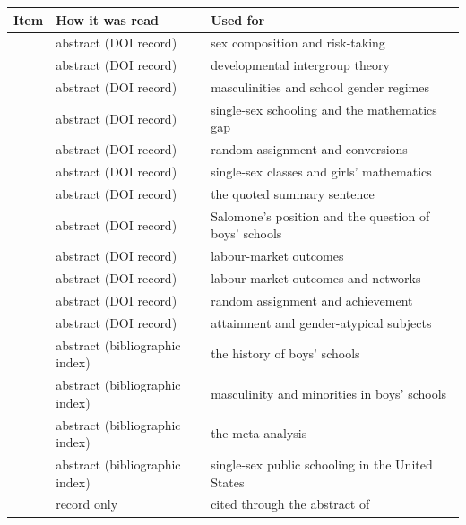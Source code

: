 \documentclass[11pt]{article}
\begin{document}
\begin{center}
\small
\begin{tabular}{>{\raggedright\arraybackslash}p{3.6cm}>{\raggedright\arraybackslash}p{4.2cm}>{\raggedright\arraybackslash}p{6.8cm}}
\toprule
Item & How it was read & Used for\\
\midrule
\citet{booth2011} & abstract (DOI record) & sex composition and risk-taking\\
\citet{bigler2007} & abstract (DOI record) & developmental intergroup theory\\
\citet{connell1996} & abstract (DOI record) & masculinities and school gender regimes\\
\citet{doris2012} & abstract (DOI record) & single-sex schooling and the mathematics gap\\
\citet{dustmann2017} & abstract (DOI record) & random assignment and conversions\\
\citet{eisenkopf2011} & abstract (DOI record) & single-sex classes and girls' mathematics\\
\citet{halpern2011} & abstract (DOI record) & the quoted summary sentence\\
\citet{heise2004} & abstract (DOI record) & Salomone's position and the question of boys' schools\\
\citet{lee2021} & abstract (DOI record) & labour-market outcomes\\
\citet{leenakazawa2021} & abstract (DOI record) & labour-market outcomes and networks\\
\citet{park2012} & abstract (DOI record) & random assignment and achievement\\
\citet{sullivan2010} & abstract (DOI record) & attainment and gender-atypical subjects\\
\citet{aspinall2024history} & abstract (bibliographic index) & the history of boys' schools\\
\citet{aspinall2024three} & abstract (bibliographic index) & masculinity and minorities in boys' schools\\
\citet{pahlke2014} & abstract (bibliographic index) & the meta-analysis\\
\citet{williams2016} & abstract (bibliographic index) & single-sex public schooling in the United States\\
\citet{salomone2017} & record only & cited through the abstract of \citet{heise2004}\\
\bottomrule
\end{tabular}
\end{center}
\end{document}

